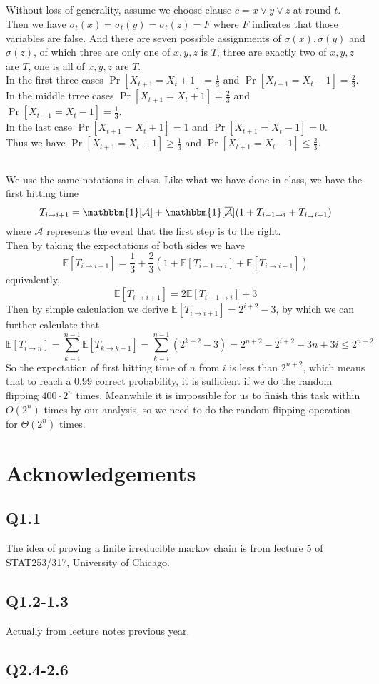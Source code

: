 \documentclass[12pt,letterpaper]{article}
\begin{document}
\subsection{}
Without loss of generality, assume we choose clause $c=x\vee y\vee z$ at round $t$.
Then we have $\sigma_t(x)=\sigma_t(y)=\sigma_t(z)=F$ where $F$ indicates that those variables are false.
And there are seven possible assignments of $\sigma(x),\sigma(y)$ and $\sigma(z)$,
of which three are only one of $x,y,z$ is $T$,
three are exactly two of $x,y,z$ are $T$,
one is all of $x,y,z$ are $T$.\\
In the first three cases $\Pr\left[X_{t+1}=X_{t}+1\right]=\frac{1}{3}$ and $\Pr\left[X_{t+1}=X_{t}-1\right]=\frac{2}{3}$.\\
In the middle trree cases  $\Pr\left[X_{t+1}=X_{t}+1\right]=\frac{2}{3}$ and $\Pr\left[X_{t+1}=X_{t}-1\right]=\frac{1}{3}$.\\
In the last case $\Pr\left[X_{t+1}=X_{t}+1\right]=1$ and $\Pr\left[X_{t+1}=X_{t}-1\right]=0$.\\
Thus we have $\Pr\left[X_{t+1}=X_{t}+1\right]\geq \frac{1}{3}$ and $\Pr\left[X_{t+1}=X_{t}-1\right]\leq\frac{2}{3}$.\\

\subsection{}
We use the same notations in class.
Like what we have done in class, we have the first hitting time 
$$T_{i\to i+1}=\mathbbm{1}[\mathcal{A}]+\mathbbm{1}[\overline{\mathcal{A}}](1+T_{i-1\to i}+T_{i_\to i+1})$$
where $\mathcal{A}$ represents the event that the first step is to the right.\\
Then by taking the expectations of both sides we have 
$$\mathbb{E}\left[T_{i\to i+1}\right]=\frac{1}{3}+\frac{2}{3}(1+\mathbb{E}\left[T_{i-1\to i}\right]+\mathbb{E}\left[T_{i\to i+1}\right])$$
equivalently,
$$\mathbb{E}\left[T_{i\to i+1}\right]=2\mathbb{E}\left[T_{i-1\to i}\right]+3$$
Then by simple calculation we derive $\mathbb{E}\left[T_{i\to i+1}\right]=2^{i+2}-3$,
by which we can further calculate that 
$$\mathbb{E}\left[T_{i\to n}\right]=\sum_{k=i}^{n-1}\mathbb{E}\left[T_{k\to k+1}\right]=\sum_{k=i}^{n-1}(2^{k+2}-3)=2^{n+2}-2^{i+2}-3n+3i\leq 2^{n+2}$$
So the expectation of first hitting time of $n$ from $i$ is less than $2^{n+2}$,
which means that to reach a 0.99 correct probability, 
it is sufficient if we do the random flipping  $400\cdot2^n$ times.
Meanwhile it is impossible for us to finish this task within $O(2^n)$ times by our analysis,
so we need to do the random flipping operation for $\Theta(2^n)$ times.

\newpage
\section{Acknowledgements}
\subsection*{Q1.1}
The idea of proving a finite irreducible markov chain is from lecture 5 of STAT253/317, University of Chicago.
\subsection*{Q1.2-1.3}
Actually from lecture notes previous year.
\subsection*{Q2.4-2.6}
\end{document}
